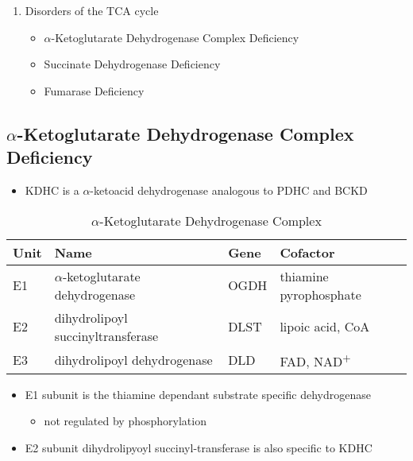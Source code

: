 \documentclass{scrartcl}
\begin{document}
\begin{enumerate}
\item Disorders of the TCA cycle
\label{sec:org213a8f6}

\begin{itemize}
\item \(\alpha\)-Ketoglutarate Dehydrogenase Complex Deficiency
\item Succinate Dehydrogenase Deficiency
\item Fumarase Deficiency
\end{itemize}
\end{enumerate}

\subsection{\(\alpha\)-Ketoglutarate Dehydrogenase Complex Deficiency}
\label{sec:orgfcb19fa}
\begin{itemize}
\item KDHC is a \(\alpha\)-ketoacid dehydrogenase analogous to PDHC and BCKD
\end{itemize}


\begin{table}[htbp]
\caption{\label{tab:orgd801a7b}\(\alpha\)-Ketoglutarate Dehydrogenase Complex}
\centering
\begin{tabular}{llll}
Unit & Name & Gene & Cofactor\\
\hline
E1 & \(\alpha\)-ketoglutarate dehydrogenase & OGDH & thiamine pyrophosphate\\
E2 & dihydrolipoyl succinyltransferase & DLST & lipoic acid, CoA\\
E3 & dihydrolipoyl dehydrogenase & DLD & FAD, NAD\textsuperscript{+}\\
\end{tabular}
\end{table}

\begin{itemize}
\item E1 subunit is the thiamine dependant substrate specific dehydrogenase
\begin{itemize}
\item not regulated by phosphorylation
\end{itemize}
\item E2 subunit dihydrolipyoyl succinyl-transferase is also specific to KDHC
\end{itemize}
\end{document}

